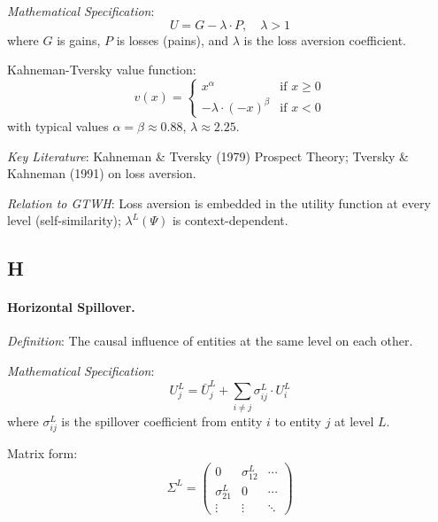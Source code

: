 \documentclass[12pt,a4paper]{article}
\begin{document}
\textit{Mathematical Specification}:
\begin{equation}
U = G - \lambda \cdot P, \quad \lambda > 1
\end{equation}
where $G$ is gains, $P$ is losses (pains), and $\lambda$ is the loss aversion 
coefficient.

Kahneman-Tversky value function:
\begin{equation}
v(x) = \begin{cases}
x^\alpha & \text{if } x \geq 0 \\
-\lambda \cdot (-x)^\beta & \text{if } x < 0
\end{cases}
\end{equation}
with typical values $\alpha = \beta \approx 0.88$, $\lambda \approx 2.25$.

\textit{Key Literature}: Kahneman \& Tversky (1979) Prospect Theory; 
Tversky \& Kahneman (1991) on loss aversion.

\textit{Relation to GTWH}: Loss aversion is embedded in the utility function 
at every level (self-similarity); $\lambda^L(\Psi)$ is context-dependent.

\subsection*{H}

\paragraph{Horizontal Spillover.}
\textit{Definition}: The causal influence of entities at the same level on each other.

\textit{Mathematical Specification}:
\begin{equation}
U^L_j = \bar{U}^L_j + \sum_{i \neq j} \sigma^L_{ij} \cdot U^L_i
\end{equation}
where $\sigma^L_{ij}$ is the spillover coefficient from entity $i$ to entity $j$ 
at level $L$.

Matrix form:
\begin{equation}
\Sigma^L = \begin{pmatrix}
0 & \sigma^L_{12} & \cdots \\
\sigma^L_{21} & 0 & \cdots \\
\vdots & \vdots & \ddots
\end{pmatrix}
\end{equation}
\end{document}
